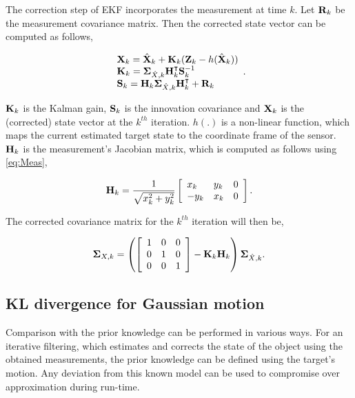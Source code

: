 The correction step of EKF incorporates the measurement at time $k$. Let ${\bf R}_k$ be the measurement covariance matrix. Then the corrected state vector can be computed as follows,

\begin{equation}
\begin{array}{l}
{\bf X}_{k} = \hat{{\bf X}}_k + {\bf K}_k ({\bf Z}_k - h(\hat{{\bf X}}_k)) \\
{\bf K}_k = {\bf \Sigma}_{\hat{X}, k} {\bf H}_k^\intercal {\bf S}_k^{-1} \\
{\bf S}_k = {\bf H}_k {\bf \Sigma}_{\hat{X}, k} {\bf H}_k^\intercal + {\bf R}_k
\end{array}.
\end{equation}

\noindent ${\bf K}_k$ is the Kalman gain, ${\bf S}_k$ is the innovation covariance and ${\bf X}_{k}$ is the (corrected) state vector at the $k^{th}$ iteration. $h(.)$ is a non-linear function, which maps the current estimated target state to the coordinate frame of the sensor. ${\bf H}_k$ is the measurement's Jacobian matrix, which is computed as follows using \ref{eq:Meas},

\begin{equation} 
{\bf H}_k = 
\frac{1}{\sqrt{x_k^2 + y_k^2}}
\left[
\begin{array}{lll}
x_k & y_k & 0 \\
-y_k & x_k & 0
\end{array}
\right].
\end{equation}

\noindent The corrected covariance matrix for the $k^{th}$ iteration will then be,

\begin{equation}
{\bf \Sigma}_{X, k} = 
\left(
\left[
\begin{array}{lll}
1 & 0 & 0 \\ 
0 & 1 & 0 \\
0 & 0 & 1 
\end{array}
\right]
- {\bf K}_k {\bf H}_k
\right)
{\bf \Sigma}_{\hat{X}, k}.
\label{eq:correctCOV}
\end{equation}

\subsection{KL divergence for Gaussian motion}
Comparison with the prior knowledge can be performed in various ways. 
For an iterative filtering, which estimates and corrects the state of the object using the obtained measurements, the prior knowledge can be defined using the target's motion. Any deviation from this known model can be used to compromise over approximation during run-time. 

